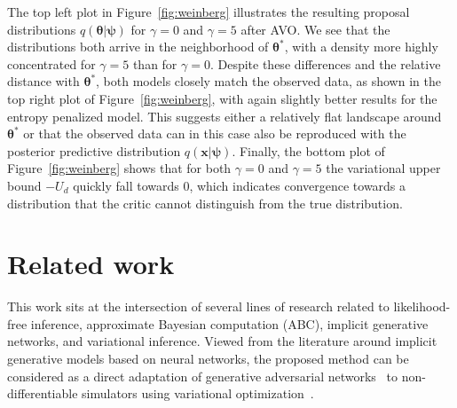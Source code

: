 \documentclass[twocolumn,superscriptaddress,aps]{revtex4-1}
\newcommand{\qxpsi}{q(\mathbf{x}|\bfpsi)}
\newcommand{\bftheta}{{\bm \theta}}
\newcommand{\bfpsi}{{\bm \psi}}
\newcommand{\bfz}{\mathbf{z}}
\theoremstyle{plain}
\begin{document}
The top left plot in Figure~\ref{fig:weinberg} illustrates the resulting
proposal distributions $q(\bftheta|\bfpsi)$ for $\gamma=0$ and $\gamma=5$ after
AVO. We see that the distributions both arrive
in the neighborhood of $\bftheta^*$, with a density  more highly concentrated for
$\gamma=5$ than for $\gamma=0$.  Despite these differences and the relative
distance with $\bftheta^*$, both models closely match the observed data, as shown
in the top right plot of  Figure~\ref{fig:weinberg}, with again slightly better
results for the entropy penalized model. This suggests either a relatively flat
landscape around $\bftheta^*$ or that the observed data can in this case also be
reproduced with the posterior predictive distribution $\qxpsi$.
Finally, the bottom plot of Figure~\ref{fig:weinberg} shows that for both
$\gamma=0$ and $\gamma=5$ the variational upper bound $-U_d$ quickly fall
towards $0$, which indicates  convergence towards a distribution that the critic
cannot distinguish from the true distribution.



\section{Related work}

This work sits at the intersection of several lines of research related to
likelihood-free inference, approximate Bayesian computation (ABC),
implicit generative networks, and variational inference.
Viewed from the literature around implicit generative models based on neural networks,
the proposed method can be considered as a direct adaptation of
generative adversarial networks~\citep{goodfellow2014generative,2017arXiv170104862A, 2017arXiv170107875A} to
non-differentiable simulators using variational optimization~\cite{2012arXiv1212.4507S,staines2013optimization}.
\end{document}
